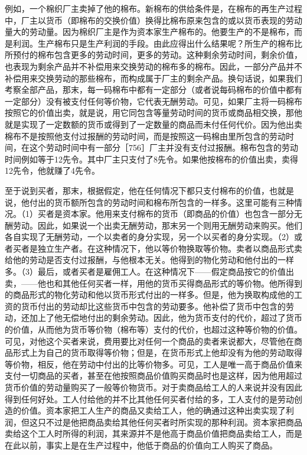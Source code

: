 例如，一个棉织厂主卖掉了他的棉布。新棉布的供给条件是，在棉布的再生产过程中，厂主以货币（即棉布的交换价值）换得比棉布原来包含的或以货币表现的劳动量大的劳动量。因为棉织厂主是作为资本家生产棉布的。他要生产的不是棉布，而是利润。生产棉布只是生产利润的手段。由此应得出什么结果呢？所生产的棉布比所预付的棉布包含更多的劳动时间，更多的劳动。这种剩余劳动时间，剩余价值，也表现为剩余产品并不补偿用来交换劳动的棉布多的棉布。因此，一部分产品并不补偿用来交换劳动的那些棉布，而构成属于厂主的剩余产品。换句话说，如果我们考察全部产品，那末，每一码棉布中都有一定部分（或者说每码棉布的价值中都有一定部分）没有被支付任何等价物，它代表无酬劳动。可见，如果厂主将一码棉布按照它的价值出卖，就是说，用它同包含等量劳动时间的货币或商品相交换，那他就是实现了一定数额的货币或得到了一定数量的商品而未付任何代价。因为他出卖棉布不是按照他支付过报酬的劳动时间，而是按照这一码棉由里所包含的劳动时间，在这个劳动时间中有一部分［756］厂主并没有支付过报酬。棉布包含的劳动时间例如等于12先令。其中厂主只支付了8先令。如果他按棉布的价值出卖，卖得12先令，他就赚了4先令。


至于说到买者，那末，根据假定，他在任何情况下都只支付棉布的价值，也就是说，他付出的货币额所包含的劳动时间和棉布所包含的一样多。这里可能有三种情况。（1）买者是资本家。他用来支付棉布的货币（即商品的价值）也包含一部分无酬劳动。因此，如果说一个出卖无酬劳动，那末另一个则用无酬劳动来购买。他们各自实现了无酬劳动，一个以卖者的身分实现，另一个以买者的身分实现。（2）或者买者是独立生产者。在这种情况下，他以等价物换取等价物。卖者以商品形式卖给他的劳动是否支付过报酬，与他根本无关。他得到的物化劳动和他付出的一样多。（3）最后，或者买者是雇佣工人。在这种情况下——假定商品按它的价值出卖，——他也和其他任何买者一样，用他的货币买得商品形式的等价物。他所得到的商品形式的物化劳动和他以货币形式付出的一样多。但是，他为换取构成他的工资的货币付出的劳动却比这些货币中包含的劳动要多。他补偿了货币中包含的劳动，还加上了他无偿地付出的剩余劳动。因此，他为货币支付的代价，超过了货币的价值，从而他为货币等价物（棉布等）支付的代价，也超过这种等价物的价值。可见，对他这个买者来说，费用要比对任何一个商品的卖者来说都大，尽管他在商品形式上为自己的货币取得等价物；但是，在货币形式上他却没有为他的劳动取得等价物，相反，他在劳动中付出的比等价物多。可见，工人是唯一高于商品价值来支付一切商品的买者，甚至在他按照商品价值购买商品时也是这样，因为他用超过货币价值的劳动量购买了一般等价物货币。对于卖商品给工人的人来说并没有因此得到任何好处。工人付给他的并不比其他任何买者付给的多，工人支付的是劳动创造的价值。资本家把工人生产的商品又卖给工人，他的确通过这种出卖实现了利润，但这只不过是他把商品卖给其他任何买者时所实现的那种利润。资本家把商品卖给这个工人时所得的利润，其来源并不是他高于商品价值把商品卖给工人，而是在此以前，事实上是在生产过程中，他低于商品的价值向工人购买了商品。

